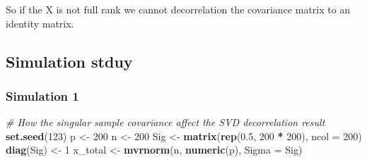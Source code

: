\documentclass[]{article}
\newenvironment{Shaded}{\begin{snugshade}}{\end{snugshade}}
\newcommand{\KeywordTok}[1]{\textcolor[rgb]{0.13,0.29,0.53}{\textbf{#1}}}
\newcommand{\DataTypeTok}[1]{\textcolor[rgb]{0.13,0.29,0.53}{#1}}
\newcommand{\DecValTok}[1]{\textcolor[rgb]{0.00,0.00,0.81}{#1}}
\newcommand{\FloatTok}[1]{\textcolor[rgb]{0.00,0.00,0.81}{#1}}
\newcommand{\StringTok}[1]{\textcolor[rgb]{0.31,0.60,0.02}{#1}}
\newcommand{\CommentTok}[1]{\textcolor[rgb]{0.56,0.35,0.01}{\textit{#1}}}
\newcommand{\OperatorTok}[1]{\textcolor[rgb]{0.81,0.36,0.00}{\textbf{#1}}}
\newcommand{\NormalTok}[1]{#1}
\begin{document}
So if the X is not full rank we cannot decorrelation the covariance
matrix to an identity matrix.

\subsection{Simulation stduy}\label{simulation-stduy}

\subsubsection{Simulation 1}\label{simulation-1}

\begin{Shaded}
\begin{Highlighting}[]
\CommentTok{# How the singular sample covariance affect the SVD decorrelation result}
\KeywordTok{set.seed}\NormalTok{(}\DecValTok{123}\NormalTok{)}
\NormalTok{p <-}\StringTok{ }\DecValTok{200}
\NormalTok{n <-}\StringTok{ }\DecValTok{200}
\NormalTok{Sig <-}\StringTok{ }\KeywordTok{matrix}\NormalTok{(}\KeywordTok{rep}\NormalTok{(}\FloatTok{0.5}\NormalTok{, }\DecValTok{200} \OperatorTok{*}\StringTok{ }\DecValTok{200}\NormalTok{), }\DataTypeTok{ncol =} \DecValTok{200}\NormalTok{)}
\KeywordTok{diag}\NormalTok{(Sig) <-}\StringTok{ }\DecValTok{1}
\NormalTok{x_total <-}\StringTok{ }\KeywordTok{mvrnorm}\NormalTok{(n, }\KeywordTok{numeric}\NormalTok{(p), }\DataTypeTok{Sigma =}\NormalTok{ Sig)}


\end{Highlighting}
\end{Shaded}
\end{document}
